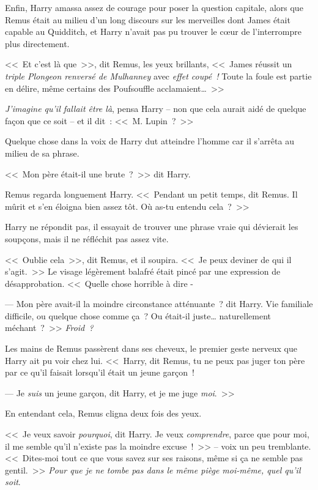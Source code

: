 Enfin, Harry amassa assez de courage pour poser la question capitale, alors que Remus était au milieu d'un long discours sur les merveilles dont James était capable au Quidditch, et Harry n'avait pas pu trouver le cœur de l'interrompre plus directement.

<<~Et c'est là que~>>, dit Remus, les yeux brillants, <<~James réussit un \emph{triple Plongeon renversé de Mulhanney} avec \emph{effet coupé~!} Toute la foule est partie en délire, même certains des Poufsouffle acclamaient…~>>

\emph{J'imagine qu'il fallait être là}, pensa Harry -- non que cela aurait aidé de quelque façon que ce soit -- et il dit~: <<~M. Lupin~?~>>

Quelque chose dans la voix de Harry dut atteindre l'homme car il s'arrêta au milieu de sa phrase.

<<~Mon père était-il une brute~?~>> dit Harry.

Remus regarda longuement Harry. <<~Pendant un petit temps, dit Remus. Il mûrit et s'en éloigna bien assez tôt. Où as-tu entendu cela~?~>>

Harry ne répondit pas, il essayait de trouver une phrase vraie qui dévierait les soupçons, mais il ne réfléchit pas assez vite.

<<~Oublie cela~>>, dit Remus, et il soupira. <<~Je peux deviner de qui il s'agit.~>> Le visage légèrement balafré était pincé par une expression de désapprobation. <<~Quelle chose horrible à dire -

--- Mon père avait-il la moindre circonstance atténuante~? dit Harry. Vie familiale difficile, ou quelque chose comme ça~? Ou était-il juste… naturellement méchant~?~>> \emph{Froid~?}

Les mains de Remus passèrent dans ses cheveux, le premier geste nerveux que Harry ait pu voir chez lui. <<~Harry, dit Remus, tu ne peux pas juger ton père par ce qu'il faisait lorsqu'il était un jeune garçon~!

--- Je \emph{suis} un jeune garçon, dit Harry, et je me juge \emph{moi}.~>>

En entendant cela, Remus cligna deux fois des yeux.

<<~Je veux savoir \emph{pourquoi}, dit Harry. Je veux \emph{comprendre}, parce que pour moi, il me semble qu'il n'existe pas la moindre excuse~!~>> -- voix un peu tremblante. <<~Dites-moi tout ce que vous savez sur ses raisons, même si ça ne semble pas gentil.~>> \emph{Pour que je ne tombe pas dans le même piège moi-même, quel qu'il soit}.


